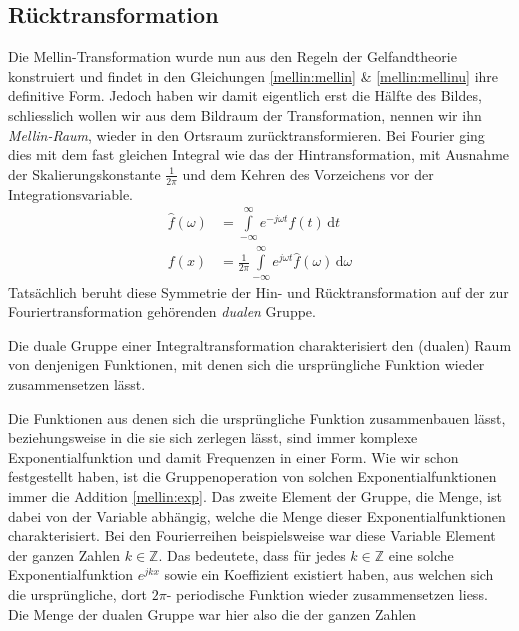\subsection{Rücktransformation
\label{mellin:subsection:ruecktransformation}}
Die Mellin-Transformation wurde nun aus den Regeln der Gelfandtheorie 
konstruiert und findet in den Gleichungen \eqref{mellin:mellin} \& 
\eqref{mellin:mellinu} ihre definitive Form.
Jedoch haben wir damit eigentlich erst die Hälfte des Bildes, schliesslich 
wollen wir aus dem Bildraum der Transformation, nennen wir ihn 
\emph{Mellin-Raum}, wieder in den Ortsraum zurücktransformieren. 
Bei Fourier ging dies mit dem fast gleichen Integral wie das der 
Hintransformation, mit Ausnahme der Skalierungskonstante $\frac{1}{2\pi}$
und dem Kehren des Vorzeichens vor der Integrationsvariable.
\begin{align*}
    \hat{f}(\omega) &= \int\limits_{-\infty}^{\infty} 
    e^{-j\omega{}t} f(t) \,\mathrm{d}t \\
    f(x) &= \frac{1}{2\pi} \int\limits_{-\infty}^{\infty} 
    e^{j\omega t} \hat{f}(\omega) \,\mathrm{d}\omega
\end{align*}
Tatsächlich beruht diese Symmetrie der Hin- und Rücktransformation auf der 
zur Fouriertransformation gehörenden \emph{dualen} Gruppe.
\begin{definition}
    Die duale Gruppe einer Integraltransformation charakterisiert den 
    (dualen) Raum von denjenigen Funktionen, mit denen sich die 
    ursprüngliche Funktion wieder zusammensetzen lässt.
\end{definition}
Die Funktionen aus denen sich die ursprüngliche Funktion zusammenbauen 
lässt, beziehungsweise in die sie sich zerlegen lässt, 
sind immer komplexe Exponentialfunktion und damit Frequenzen in einer Form.
Wie wir schon festgestellt haben, ist die Gruppenoperation von solchen 
Exponentialfunktionen immer die Addition \eqref{mellin:exp}.
Das zweite Element der Gruppe, die Menge, ist dabei von der Variable 
abhängig, welche die Menge dieser Exponentialfunktionen charakterisiert.
Bei den Fourierreihen beispielsweise war diese Variable Element der ganzen 
Zahlen $k \in \mathbb{Z}$.
Das bedeutete, dass für jedes $k \in \mathbb{Z}$ eine solche 
Exponentialfunktion $e^{jkx}$ sowie ein Koeffizient existiert haben, aus 
welchen sich die ursprüngliche, dort $2\pi$- periodische Funktion wieder 
zusammensetzen liess.
Die Menge der dualen Gruppe war hier also die der ganzen Zahlen 
